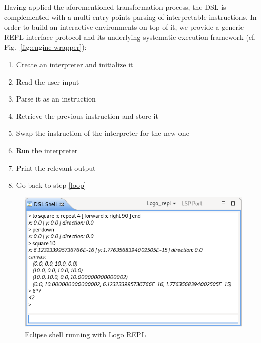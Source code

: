 Having applied the aforementioned transformation process, the DSL is complemented with a multi entry points parsing of interpretable instructions. In order to build an interactive environments on top of it, we provide a generic REPL interface protocol and its underlying systematic execution framework (cf. Fig.~\ref{fig:engine-wrapper}):
\begin{samepage}
\begin{enumerate}
    \item Create an interpreter and initialize it
    \item \label{loop} Read the user input
    \item Parse it as an instruction
    \item Retrieve the previous instruction and store it
    \item Swap the instruction of the interpreter for the new one
    \item Run the interpreter
    \item Print the relevant output
    \item Go back to step \ref{loop}
\end{enumerate}
\end{samepage}


\begin{figure}[t]
	\centering
	\includegraphics[width=\linewidth]{figures/logo_shell.png}
	\caption{Eclipse shell running with Logo REPL}
	\label{fig:logo_shell}
\end{figure}

